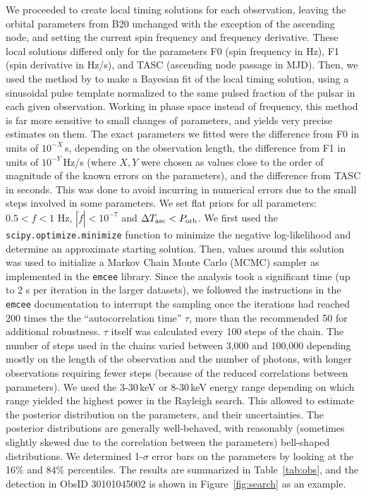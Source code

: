 \documentclass[twocolumn]{aastex631}
\newcommand{\Porb}{\ensuremath{P_{\rm orb}}}
\newcommand{\tasc}{\ensuremath{T_{\rm asc}{}}}
\newcommand{\figref}{Figure~\ref}
\newcommand{\tabref}{Table~\ref}
\begin{document}
We proceeded to create local timing solutions for each observation, leaving the orbital parameters from B20 unchanged with the exception of the ascending node, and setting the current spin frequency and frequency derivative.
These local solutions differed only for the parameters F0 (spin frequency in Hz), F1 (spin derivative in Hz/s), and TASC (ascending node passage in MJD).
Then, we used the method by \citet{pletschGammaRayTimingRedback2015} to make a Bayesian fit of the local timing solution, using a sinusoidal pulse template normalized to the same pulsed fraction of the pulsar in each given observation.
Working in phase space instead of frequency, this method is far more sensitive to small changes of parameters, and yields very precise estimates on them.
The exact parameters we fitted were the difference from F0 in units of $10^{-X}$\,s, depending on the observation length, the difference from F1 in units of $10^{-Y}$\,Hz/s (where $X,Y$ were chosen as values close to the order of magnitude of the known errors on the parameters), and the difference from TASC in seconds.
This was done to avoid incurring in numerical errors due to the small steps involved in some parameters.
We set flat priors for all parameters: $0.5 < f < 1$ Hz, $|\dot{f}| < 10^{-7}$ and $\Delta\tasc < \Porb$.
We first used the \texttt{scipy.optimize.minimize} function to minimize the negative log-likelihood and determine an approximate starting solution.
Then, values around this solution was used to initialize a Markov Chain Monte Carlo (MCMC) sampler as implemented in the \texttt{emcee} \citep{2013PASP..125..306F} library.
Since the analysis took a significant time (up to 2 s per iteration in the larger datasets), we followed the instructions in the \texttt{emcee} documentation to interrupt the sampling once the iterations had reached 200 times the the ``autocorrelation time'' $\tau$, more than the recommended 50 for additional robustness.
$\tau$ itself was calculated every 100 steps of the chain.
The number of steps used in the chains varied between 3,000 and 100,000 depending mostly on the length of the observation and the number of photons, with longer observations requiring fewer steps (because of the reduced correlations between parameters).
We used the 3-30\,keV or 8-30\,keV  energy range depending on which range yielded the highest power in the Rayleigh search.
This allowed to estimate the posterior distribution on the parameters, and their uncertainties.
The posterior distributions are generally well-behaved, with reasonably (sometimes slightly skewed due to the correlation between the parameters) bell-shaped distributions.
We determined 1-$\sigma$ error bars on the parameters by looking at the 16\% and 84\% percentiles.
The results are summarized in \tabref{tab:obs}, and the detection in ObsID 30101045002 is shown in \figref{fig:search} as an example.
\end{document}
